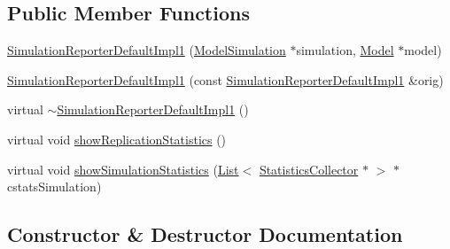 \subsection*{Public Member Functions}
\begin{DoxyCompactItemize}
\item 
\hyperlink{class_simulation_reporter_default_impl1_a4bf4dc49a515e4e7b9201dc5139b13af}{Simulation\+Reporter\+Default\+Impl1} (\hyperlink{class_model_simulation}{Model\+Simulation} $\ast$simulation, \hyperlink{class_model}{Model} $\ast$model)
\item 
\hyperlink{class_simulation_reporter_default_impl1_ab95422739ce3be347ade89ec471e7ee2}{Simulation\+Reporter\+Default\+Impl1} (const \hyperlink{class_simulation_reporter_default_impl1}{Simulation\+Reporter\+Default\+Impl1} \&orig)
\item 
virtual \hyperlink{class_simulation_reporter_default_impl1_ab40c25be154b8d07b03e360dca479d14}{$\sim$\+Simulation\+Reporter\+Default\+Impl1} ()
\item 
virtual void \hyperlink{class_simulation_reporter_default_impl1_a14e81b56d8a18ec929aa34db4e59cfa8}{show\+Replication\+Statistics} ()
\item 
virtual void \hyperlink{class_simulation_reporter_default_impl1_aa8d94c9912cbaeb276bb7b1569c9bcaf}{show\+Simulation\+Statistics} (\hyperlink{class_list}{List}$<$ \hyperlink{class_statistics_collector}{Statistics\+Collector} $\ast$ $>$ $\ast$cstats\+Simulation)
\end{DoxyCompactItemize}


\subsection{Constructor \& Destructor Documentation}
